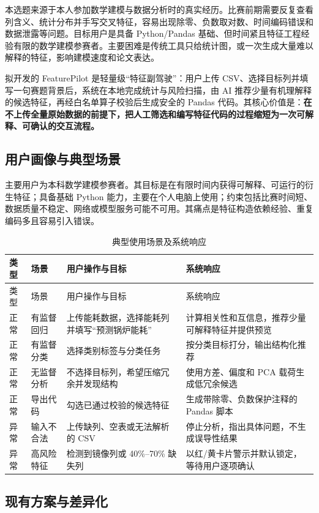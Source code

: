 \documentclass[UTF8,12pt,a4paper]{ctexart}
\begin{document}
本选题来源于本人参加数学建模与数据分析时的真实经历。比赛前期需要反复查看列含义、统计分布并手写交叉特征，容易出现除零、负数取对数、时间编码错误和数据泄露等问题。目标用户是具备 Python/Pandas 基础、但时间紧且特征工程经验有限的数学建模参赛者。主要困难是传统工具只给统计图，或一次生成大量难以解释的特征，影响建模速度和论文表达。

拟开发的 FeaturePilot 是轻量级“特征副驾驶”：用户上传 CSV、选择目标列并填写一句赛题背景后，系统在本地完成统计与风险扫描，由 AI 推荐少量有机理解释的候选特征，再经白名单算子校验后生成安全的 Pandas 代码。其核心价值是：\textbf{在不上传全量原始数据的前提下，把人工筛选和编写特征代码的过程缩短为一次可解释、可确认的交互流程。}

\subsection{用户画像与典型场景}

主要用户为本科数学建模参赛者。其目标是在有限时间内获得可解释、可运行的衍生特征；具备基础 Python 能力，主要在个人电脑上使用；约束包括比赛时间短、数据质量不稳定、网络或模型服务可能不可用。其痛点是特征构造依赖经验、重复编码多且容易引入错误。

\begin{longtable}{p{1.3cm}p{2cm}p{5.1cm}p{5.2cm}}
\caption{典型使用场景及系统响应}\label{tab:scenes}\\
\toprule
类型 & 场景 & 用户操作与目标 & 系统响应 \\
\midrule
\endfirsthead
\toprule
类型 & 场景 & 用户操作与目标 & 系统响应 \\
\midrule
\endhead
正常 & 有监督回归 & 上传能耗数据，选择能耗列并填写“预测锅炉能耗” & 计算相关性和互信息，推荐少量可解释特征并提供预览 \\
正常 & 有监督分类 & 选择类别标签与分类任务 & 按分类目标打分，输出结构化推荐 \\
正常 & 无监督分析 & 不选择目标列，希望压缩冗余并发现结构 & 使用方差、偏度和 PCA 载荷生成低冗余候选 \\
正常 & 导出代码 & 勾选已通过校验的候选特征 & 生成带除零、负数保护注释的 Pandas 脚本 \\
异常 & 输入不合法 & 上传缺列、空表或无法解析的 CSV & 停止分析，指出具体问题，不生成误导性结果 \\
异常 & 高风险特征 & 检测到镜像列或 40\%--70\% 缺失列 & 以红/黄卡片警示并默认锁定，等待用户逐项确认 \\
\bottomrule
\end{longtable}

\subsection{现有方案与差异化}
\end{document}
